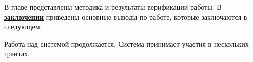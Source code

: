 \begin{enumerate}
\end{enumerate}
В главе представлены методика и результаты верификации работы.
В \underline{\textbf{заключении}} приведены основные выводы по работе, которые заключаются в следующем:


Работа над системой продолжается. Система принимает участия в нескольких грантах. 

\renewcommand{\refname}{\large Публикации автора по теме диссертации}
\nocite{*}
\insertbiblioall

